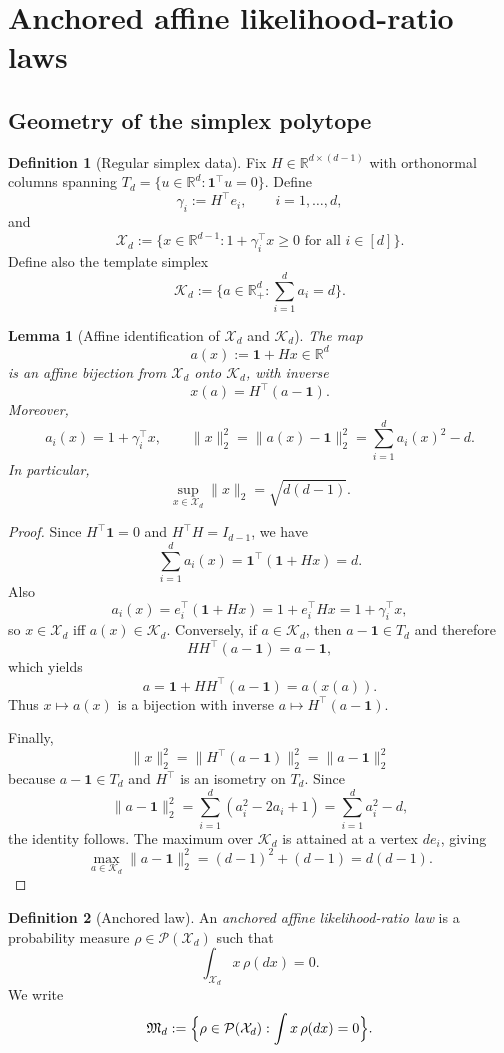 \documentclass[11pt]{amsart}
\newtheorem{lemma}[lemma]{Lemma}
\theoremstyle{definition}
\newtheorem{definition}[definition]{Definition}
\newcommand{\one}{\mathbf 1}
\newcommand{\R}{\mathbb R}
\newcommand{\cP}{\mathcal P}
\newcommand{\cX}{\mathcal X}
\newcommand{\fM}{\mathfrak M}
\newcommand{\cK}{\mathcal K}
\begin{document}
\section{Anchored affine likelihood-ratio laws}\label{sec:anchored}

\subsection{Geometry of the simplex polytope}

\begin{definition}[Regular simplex data]
Fix $H\in\R^{d\times(d-1)}$ with orthonormal columns spanning $T_d=\{u\in\R^d:\one^\top u=0\}$. Define
\[
\gamma_i:=H^\top e_i,\qquad i=1,\dots,d,
\]
and
\[
\cX_d:=\{x\in\R^{d-1}:1+\gamma_i^\top x\ge 0\text{ for all }i\in[d]\}.
\]
Define also the template simplex
\[
\cK_d:=\{a\in\R_+^d:\sum_{i=1}^d a_i=d\}.
\]
\end{definition}

\begin{lemma}[Affine identification of $\cX_d$ and $\cK_d$]\label{lem:polytope-template}
The map
\[
a(x):=\one+Hx\in\R^d
\]
is an affine bijection from $\cX_d$ onto $\cK_d$, with inverse
\[
x(a)=H^\top(a-\one).
\]
Moreover,
\[
a_i(x)=1+\gamma_i^\top x,
\qquad
\|x\|_2^2=\|a(x)-\one\|_2^2=\sum_{i=1}^d a_i(x)^2-d.
\]
In particular,
\[
\sup_{x\in\cX_d}\|x\|_2=\sqrt{d(d-1)}.
\]
\end{lemma}

\begin{proof}
Since $H^\top\one=0$ and $H^\top H=I_{d-1}$, we have
\[
\sum_{i=1}^d a_i(x)=\one^\top(\one+Hx)=d.
\]
Also
\[
a_i(x)=e_i^\top(\one+Hx)=1+e_i^\top Hx=1+\gamma_i^\top x,
\]
so $x\in\cX_d$ iff $a(x)\in\cK_d$. Conversely, if $a\in\cK_d$, then $a-\one\in T_d$ and therefore
\[
H H^\top(a-\one)=a-\one,
\]
which yields
\[
a=\one+H H^\top(a-\one)=a(x(a)).
\]
Thus $x\mapsto a(x)$ is a bijection with inverse $a\mapsto H^\top(a-\one)$.

Finally,
\[
\|x\|_2^2=\|H^\top(a-\one)\|_2^2=\|a-\one\|_2^2
\]
because $a-\one\in T_d$ and $H^\top$ is an isometry on $T_d$. Since
\[
\|a-\one\|_2^2=\sum_{i=1}^d(a_i^2-2a_i+1)=\sum_{i=1}^d a_i^2-d,
\]
the identity follows. The maximum over $\cK_d$ is attained at a vertex $de_i$, giving
\[
\max_{a\in\cK_d}\|a-\one\|_2^2=(d-1)^2+(d-1)=d(d-1).
\]
\end{proof}

\begin{definition}[Anchored law]
An \emph{anchored affine likelihood-ratio law} is a probability measure $\rho\in\cP(\cX_d)$ such that
\[
\int_{\cX_d} x\,\rho(dx)=0.
\]
We write
\[
\fM_d:=\Bigl\{\rho\in\cP(\cX_d):\int x\,\rho(dx)=0\Bigr\}.
\]
\end{definition}
\end{document}

